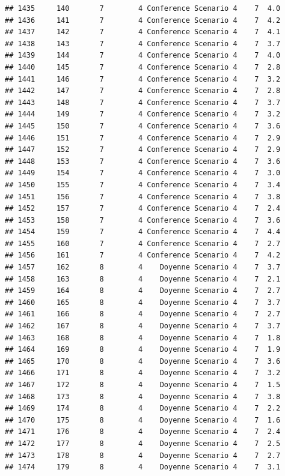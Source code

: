 \documentclass[
]{article}
\begin{document}
\begin{verbatim}
## 1435     140       7        4 Conference Scenario 4    7  4.0
## 1436     141       7        4 Conference Scenario 4    7  4.2
## 1437     142       7        4 Conference Scenario 4    7  4.1
## 1438     143       7        4 Conference Scenario 4    7  3.7
## 1439     144       7        4 Conference Scenario 4    7  4.0
## 1440     145       7        4 Conference Scenario 4    7  2.8
## 1441     146       7        4 Conference Scenario 4    7  3.2
## 1442     147       7        4 Conference Scenario 4    7  2.8
## 1443     148       7        4 Conference Scenario 4    7  3.7
## 1444     149       7        4 Conference Scenario 4    7  3.2
## 1445     150       7        4 Conference Scenario 4    7  3.6
## 1446     151       7        4 Conference Scenario 4    7  2.9
## 1447     152       7        4 Conference Scenario 4    7  2.9
## 1448     153       7        4 Conference Scenario 4    7  3.6
## 1449     154       7        4 Conference Scenario 4    7  3.0
## 1450     155       7        4 Conference Scenario 4    7  3.4
## 1451     156       7        4 Conference Scenario 4    7  3.8
## 1452     157       7        4 Conference Scenario 4    7  2.4
## 1453     158       7        4 Conference Scenario 4    7  3.6
## 1454     159       7        4 Conference Scenario 4    7  4.4
## 1455     160       7        4 Conference Scenario 4    7  2.7
## 1456     161       7        4 Conference Scenario 4    7  4.2
## 1457     162       8        4    Doyenne Scenario 4    7  3.7
## 1458     163       8        4    Doyenne Scenario 4    7  2.1
## 1459     164       8        4    Doyenne Scenario 4    7  2.7
## 1460     165       8        4    Doyenne Scenario 4    7  3.7
## 1461     166       8        4    Doyenne Scenario 4    7  2.7
## 1462     167       8        4    Doyenne Scenario 4    7  3.7
## 1463     168       8        4    Doyenne Scenario 4    7  1.8
## 1464     169       8        4    Doyenne Scenario 4    7  1.9
## 1465     170       8        4    Doyenne Scenario 4    7  3.6
## 1466     171       8        4    Doyenne Scenario 4    7  3.2
## 1467     172       8        4    Doyenne Scenario 4    7  1.5
## 1468     173       8        4    Doyenne Scenario 4    7  3.8
## 1469     174       8        4    Doyenne Scenario 4    7  2.2
## 1470     175       8        4    Doyenne Scenario 4    7  1.6
## 1471     176       8        4    Doyenne Scenario 4    7  2.4
## 1472     177       8        4    Doyenne Scenario 4    7  2.5
## 1473     178       8        4    Doyenne Scenario 4    7  2.7
## 1474     179       8        4    Doyenne Scenario 4    7  3.1

\end{verbatim}
\end{document}
